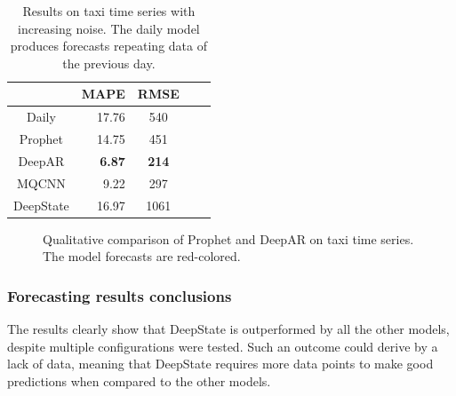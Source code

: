 \documentclass[a4paper, 12pt]{article} %
\newcommand{\ra}[1]{\renewcommand{\arraystretch}{#1}}
\begin{document}
	\begin{table}\centering 
		\ra{1.3}
		\begin{tabular}{@{}crcrc@{}}
			\midrule
			& MAPE & RMSE\\
			\midrule
			Daily & 17.76 & 540\\
			Prophet & 14.75 & 451\\
			DeepAR & \textbf{6.87} & \textbf{214}\\
			MQCNN & 9.22 & 297\\
			DeepState & 16.97 & 1061\\
			\bottomrule
		\end{tabular}
		\caption{Results on taxi time series with increasing noise. The daily model produces forecasts repeating data of the previous day. } \label{table:results_forecasting_taxi}
	\end{table}

	\begin{figure}\centering
		
		\caption{Qualitative comparison of Prophet and DeepAR on taxi time series. The model forecasts are red-colored.}
		\label{fig:results_forecasting_taxi_prophet_deepar}
	\end{figure}
	
	\clearpage
	\subsubsection{Forecasting results conclusions}
	The results clearly show that DeepState is outperformed by all the other models, despite multiple configurations were tested. Such an outcome could derive by a lack of data, meaning that DeepState requires more data points to make good predictions when compared to the other models.
	
\end{document}

